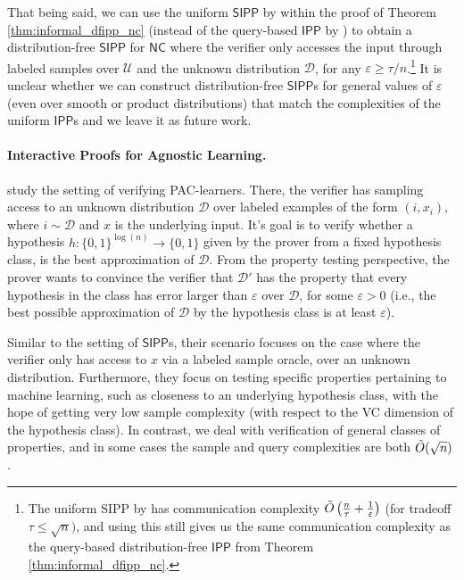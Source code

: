 \documentclass[10pt,a4paper]{article}
\newcommand{\NC}{\mathsf{NC}}
\newcommand{\IPP}{\mathsf{IPP}}
\newcommand{\sU}{\mathcal{U}}
\newcommand{\sD}{\mathcal{D}}
\newcommand{\eps}{\varepsilon}
\begin{document}
That being said, we can use the uniform $\mathsf{SIPP}$ by \cite{GR22_sample} within the proof of Theorem \ref{thm:informal_dfipp_nc} (instead of the query-based $\IPP$ by \cite{RR20_batch_polylog}) to obtain a distribution-free $\mathsf{SIPP}$ for $\NC$ where the verifier only accesses the input through labeled samples over $\sU$ and the unknown distribution $\sD$, for any $\varepsilon \geq \tau/n$.\footnote{The uniform \textsf{SIPP} by \cite{GR22_sample} has communication complexity $\Tilde{O}\left(\frac{n}{\tau} + \frac{1}{\eps} \right)$ (for tradeoff  $\tau \leq \sqrt{n})$, and using this still gives us the same communication complexity as the query-based distribution-free $\IPP$ from Theorem \ref{thm:informal_dfipp_nc}.} It is unclear whether we can construct distribution-free $\mathsf{SIPP}$s for general values of $\varepsilon$ (even over smooth or product distributions) that match the complexities of the uniform $\IPP$s and we leave it as future work.

\paragraph{Interactive Proofs for Agnostic Learning.} \cite{GRSY21} study the setting of verifying PAC-learners. There, the verifier has sampling access to an unknown distribution $\sD$ over labeled examples of the form $(i,x_i)$, where $i \sim \sD$ and $x$ is the underlying input. It's goal is to verify whether a hypothesis $h : \{0,1\}^{\log(n)} \rightarrow \{0,1\}$ given by the prover from a fixed hypothesis class, is the best approximation of $\sD$. From the property testing perspective, the prover wants to convince the verifier that $\sD'$ has the property that every hypothesis in the class has error larger than $\varepsilon$ over $\sD$, for some $\varepsilon > 0$ (i.e., the best possible approximation of $\sD$ by the hypothesis class is at least $\varepsilon$).

Similar to the setting of $\mathsf{SIPP}$s, their scenario focuses on the case where the verifier only has access to $x$ via a labeled sample oracle, over an unknown distribution. Furthermore, they focus on testing specific properties pertaining to machine learning, such as closeness to an underlying hypothesis class, with the hope of getting very low sample complexity (with respect to the VC dimension of the hypothesis class). In contrast, we deal with verification of general classes of properties, and in some cases the sample and query complexities are both $\Tilde{O}(\sqrt{n})$.
\end{document}

